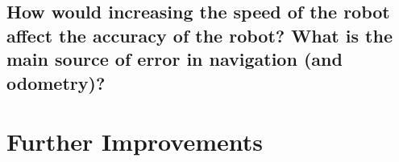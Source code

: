 \documentclass[11pt]{article}
\begin{document}
\subsection{How would increasing the speed of the robot affect the accuracy of the robot? What is
the main source of error in navigation (and odometry)?}
\section{Further Improvements}
\end{document}
